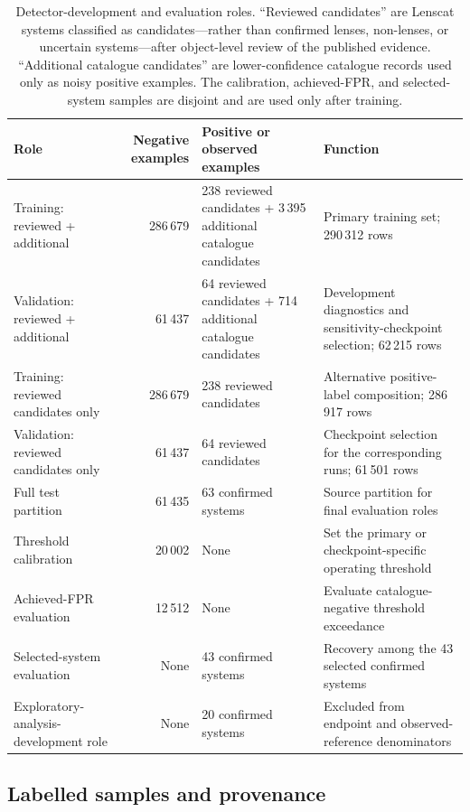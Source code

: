 \begin{table}
\caption{Detector-development and evaluation roles. ``Reviewed candidates''
are Lenscat systems classified as candidates---rather than confirmed lenses,
non-lenses, or uncertain systems---after object-level review of the published
evidence.
``Additional catalogue candidates'' are lower-confidence catalogue records
used only as noisy positive examples. The calibration, achieved-FPR, and
selected-system samples are disjoint and are used only after training.}
\label{tab:detector_roles_overview}
\centering
{\small
\setlength{\tabcolsep}{4pt}
\begin{tabular}{L{0.21\textwidth}rL{0.29\textwidth}L{0.27\textwidth}}
\toprule
Role & Negative examples & Positive or observed examples & Function \\
\midrule
Training: reviewed + additional &
286\,679 & 238 reviewed candidates + 3\,395 additional catalogue candidates &
Primary training set; 290\,312 rows \\
Validation: reviewed + additional &
61\,437 & 64 reviewed candidates + 714 additional catalogue candidates &
Development diagnostics and sensitivity-checkpoint selection; 62\,215 rows \\
Training: reviewed candidates only &
286\,679 & 238 reviewed candidates &
Alternative positive-label composition; 286\,917 rows \\
Validation: reviewed candidates only &
61\,437 & 64 reviewed candidates &
Checkpoint selection for the corresponding runs; 61\,501 rows \\
Full test partition &
61\,435 & 63 confirmed systems &
Source partition for final evaluation roles \\
Threshold calibration &
20\,002 & None &
Set the primary or checkpoint-specific operating threshold \\
Achieved-FPR evaluation &
12\,512 & None &
Evaluate catalogue-negative threshold exceedance \\
Selected-system evaluation &
None & 43 confirmed systems &
Recovery among the 43 selected confirmed systems \\
Exploratory-analysis-development role &
None & 20 confirmed systems &
Excluded from endpoint and observed-reference denominators \\
\bottomrule
\end{tabular}
}
\end{table}

\subsection{Labelled samples and provenance}
\label{sec:sample_provenance}

